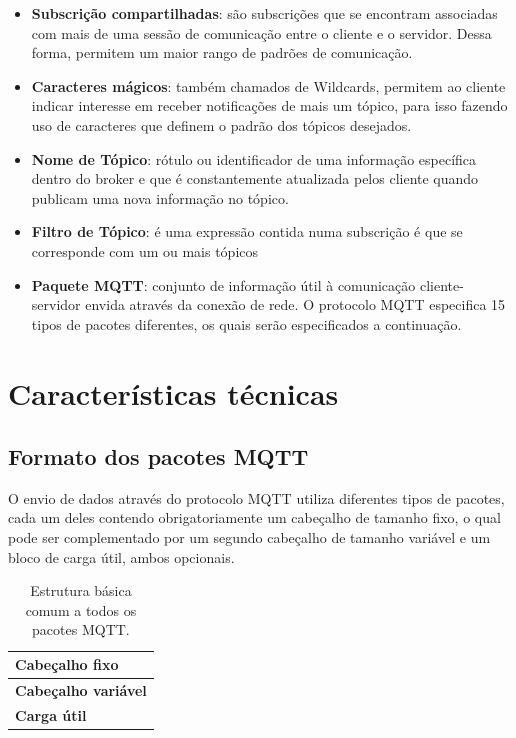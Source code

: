 \documentclass[12pt, a4paper]{article}
\begin{document}
\begin{itemize}
    \item \textbf{Subscrição compartilhadas}: são subscrições que se encontram associadas com mais de uma sessão de comunicação entre o cliente e o servidor. Dessa forma, permitem um maior rango de padrões de comunicação.
    \item \textbf{Caracteres mágicos}: também chamados de Wildcards, permitem ao cliente indicar interesse em receber notificações de mais um tópico, para isso fazendo uso de caracteres que definem o padrão dos tópicos desejados.
    \item \textbf{Nome de Tópico}: rótulo ou identificador de uma informação específica dentro do broker e que é constantemente atualizada pelos cliente quando publicam uma nova informação no tópico.
    \item \textbf{Filtro de Tópico}: é uma expressão contida numa subscrição é que se corresponde com um ou mais tópicos
    \item \textbf{Paquete MQTT}: conjunto de informação útil à comunicação cliente-servidor envida através da conexão de rede. O protocolo MQTT especifica 15 tipos de pacotes diferentes, os quais serão especificados a continuação.
\end{itemize}

\cleardoublepage

\section{Características técnicas}
\subsection{Formato dos pacotes MQTT}\label{Formato dos pacotes MQTT}

O envio de dados através do protocolo MQTT utiliza diferentes tipos de pacotes, cada um deles contendo obrigatoriamente um cabeçalho de tamanho fixo, o qual pode ser complementado por um segundo cabeçalho de tamanho variável e um bloco de carga útil, ambos opcionais.

\begin{table}[h!]\caption{Estrutura básica comum a todos os pacotes MQTT.}
\centering
\begin{tabular}{|l|}
\hline
\textbf{Cabeçalho fixo}     \\ \hline
\textbf{Cabeçalho variável} \\ \hline
\textbf{Carga útil}         \\ \hline
\end{tabular}
\end{table}
\end{document}
